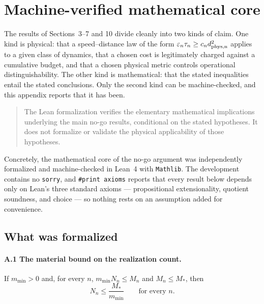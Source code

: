 
\appendix
\section{Machine-verified mathematical core}
\label{app:lean}
\begingroup
\setlength{\emergencystretch}{3em}

The results of Sections~3--7 and 10 divide cleanly into two kinds of claim. One kind is
physical: that a speed--distance law of the form
$\varepsilon_n\tau_n\ge c_nd_{\rm phys,n}^2$ applies to a given class of
dynamics, that a chosen cost is legitimately charged against a cumulative
budget, and that a chosen physical metric controls operational
distinguishability. The other kind is mathematical: that the stated inequalities
entail the stated conclusions. Only the second kind can be machine-checked, and
this appendix reports that it has been.

\begin{quote}
The Lean formalization verifies the elementary mathematical implications
underlying the main no-go results, conditional on the stated hypotheses. It does
not formalize or validate the physical applicability of those hypotheses.
\end{quote}

Concretely, the mathematical core of the no-go argument was independently
formalized and machine-checked in Lean~4 with \texttt{Mathlib}. The development
contains no \texttt{sorry}, and \verb|#print axioms| reports that every result
below depends only on Lean's three standard axioms --- propositional
extensionality, quotient soundness, and choice --- so nothing rests on an
assumption added for convenience.

\subsection{What was formalized}

\paragraph{A.1 The material bound on the realization count.}
If $m_{\min}>0$ and, for every $n$, $m_{\min}N_n\le M_n$ and $M_n\le M_*$, then
\[
N_n\le\frac{M_*}{m_{\min}}\qquad\text{for every }n.
\]

